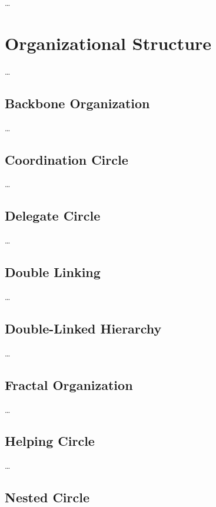 {\ldots}

\chapter{Organizational Structure}
\label{organizationalstructure}

{\ldots}

\section{Backbone Organization}
\label{backboneorganization}

{\ldots}

\section{Coordination Circle}
\label{coordinationcircle}

{\ldots}

\section{Delegate Circle}
\label{delegatecircle}

{\ldots}

\section{Double Linking}
\label{doublelinking}

{\ldots}

\section{Double-Linked Hierarchy}
\label{double-linkedhierarchy}

{\ldots}

\section{Fractal Organization}
\label{fractalorganization}

{\ldots}

\section{Helping Circle}
\label{helpingcircle}

{\ldots}

\section{Nested Circle}
\label{nestedcircle}

